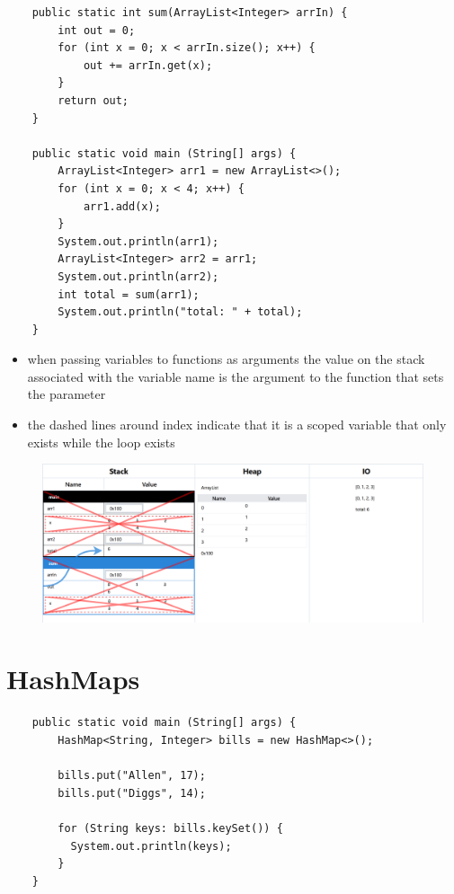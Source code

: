 \documentclass{article}
\begin{document}
\begin{verbatim}
	public static int sum(ArrayList<Integer> arrIn) {
	    int out = 0;
	    for (int x = 0; x < arrIn.size(); x++) {
	        out += arrIn.get(x);
	    }
	    return out;
	}

	public static void main (String[] args) {
	    ArrayList<Integer> arr1 = new ArrayList<>();
	    for (int x = 0; x < 4; x++) {
	        arr1.add(x);
	    }
	    System.out.println(arr1);
	    ArrayList<Integer> arr2 = arr1;
	    System.out.println(arr2);
	    int total = sum(arr1);
	    System.out.println("total: " + total);
	}
\end{verbatim}

\begin{itemize}
	\item when passing variables to functions as arguments the value on the
	stack associated with the variable name is the argument to the function
	that sets the parameter
	\item the dashed lines around index indicate that it is a scoped variable
	that only exists while the loop exists
\end{itemize}

\begin{figure}[H]
	\centering
	\includegraphics{arrayListsFunc.png}
\end{figure}

\pagebreak


\section{HashMaps}

\begin{verbatim}
	public static void main (String[] args) {
	    HashMap<String, Integer> bills = new HashMap<>();
	    
	    bills.put("Allen", 17);
	    bills.put("Diggs", 14);
	    
	    for (String keys: bills.keySet()) {
	      System.out.println(keys);
	    }
	}
\end{verbatim}
\end{document}
